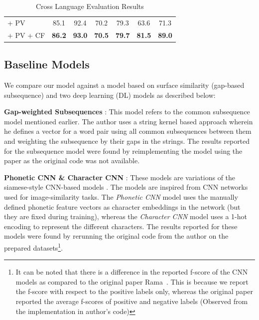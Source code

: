 \documentclass[11pt,letterpaper]{article}
\begin{document}
\begin{table}[t]
\begin{tabular}{lcccccc}
\quad + PV                                                & 85.1                                 & 92.4                             & 70.2                  & 79.3              & 63.6              & 71.3           \\
\quad + PV + CF                                           & \textbf{86.2}                        & \textbf{93.0}                    & \textbf{70.5}         & \textbf{79.7}     & \textbf{81.5}              & \textbf{89.0}
\end{tabular}

\label{CL_res}
\caption{Cross Language Evaluation Results }
\end{table}
\subsection{Baseline Models}

We compare our model against a model based on surface similarity (gap-based subsequence) and two deep learning (DL) models as described below:

\textbf{Gap-weighted Subsequences} : This model refers to the common subsequence model \cite{rama2015automatic} mentioned earlier. The author uses a string kernel based approach wherein he defines a vector for a word pair using all common subsequences between them and weighting the subsequence by their gaps in the strings. The results reported for the subsequence model were found by reimplementing the model using the paper as the original code was not available.

\textbf{Phonetic CNN \& Character CNN} : These models are variations of the siamese-style CNN-based models \cite{rama2016siamese}. The models are inspired from CNN networks used for image-similarity tasks. The \textit{Phonetic CNN} model uses the manually defined phonetic feature vectors as character embeddings in the network (but they are fixed during training), whereas the \textit{Character CNN} model uses a 1-hot encoding to represent the different characters. The results reported for these models were found by rerunning the original code from the  author on the prepared datasets\footnote{It can be noted that there is a difference in the reported f-score of the CNN models as compared to the original paper Rama~. This is because we report the f-score with respect to the positive labels only, whereas the original paper reported the average f-scores of positive and negative labels (Observed from the implementation in author's code)}.
\end{document}

